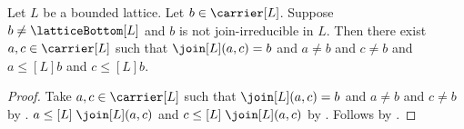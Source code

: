 \begin{proposition}\label{not_join_irreducible_witness_below}
    Let $L$ be a bounded lattice.
    Let $b\in\carrier[L]$.
    Suppose $b\neq\latticeBottom[L]$ and
        $b$ is not join-irreducible in $L$.
    Then there exist $a,c\in\carrier[L]$ such that
        $\join[L](a,c)=b$ and $a\neq b$ and $c\neq b$ and
        $a\mathrel{\leq[L]}b$ and $c\mathrel{\leq[L]}b$.
\end{proposition}
\begin{proof}
    Take $a,c\in\carrier[L]$ such that
        $\join[L](a,c)=b$ and $a\neq b$ and $c\neq b$ by
        .
    $a\mathrel{\leq[L]}\join[L](a,c)$ and
        $c\mathrel{\leq[L]}\join[L](a,c)$ by .
    Follows by \auto.
\end{proof}

